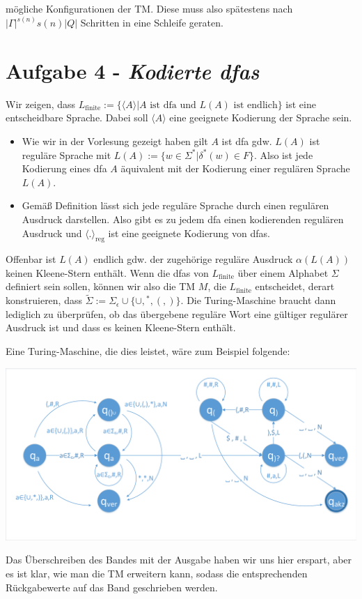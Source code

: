 \documentclass{article}
\begin{document}
mögliche Konfigurationen der TM. Diese muss also spätestens nach $|\Gamma|^{s(n)} s(n) |Q|$ Schritten in eine Schleife geraten.

\section*{Aufgabe 4 - \textit{Kodierte dfas}}

Wir zeigen, dass $L_\text{finite} := \{\langle A \rangle | A \text{ ist dfa und } L(A) \text{ ist endlich} \}$ ist eine entscheidbare Sprache. Dabei soll $\langle A \rangle$ eine geeignete Kodierung der Sprache sein.\\

\begin{itemize}
	\item Wie wir in der Vorlesung gezeigt haben gilt $A$ ist dfa gdw. $L(A)$ ist reguläre Sprache mit $L(A) := \{w \in \Sigma^* | \delta^*(w) \in F\}$. Also ist jede Kodierung eines dfa $A$ äquivalent mit der Kodierung einer regulären Sprache $L(A)$.
	
	\item Gemäß Definition lässt sich jede reguläre Sprache durch einen regulären Ausdruck darstellen. Also gibt es zu jedem dfa einen kodierenden regulären Ausdruck und $\langle . \rangle_\text{reg}$ ist eine geeignete Kodierung von dfas.
\end{itemize}

Offenbar ist $L(A)$ endlich gdw. der zugehörige reguläre Ausdruck $\alpha(L(A))$ keinen Kleene-Stern enthält. Wenn die dfas von $L_\text{finite}$ über einem Alphabet $\Sigma$ definiert sein sollen, können wir also die TM $M$, die $L_\text{finite}$ entscheidet, derart konstruieren, dass $\tilde{\Sigma} := \Sigma_\epsilon \cup \{\cup,{}^*, (,) \}$. Die Turing-Maschine braucht dann lediglich zu überprüfen, ob das übergebene reguläre Wort eine gültiger regulärer Ausdruck ist und dass es keinen Kleene-Stern enthält.

Eine Turing-Maschine, die dies leistet, wäre zum Beispiel folgende:

\begin{minipage}{\textwidth}
	\centering\includegraphics[width=\textwidth,page=1,trim={2 2 2 4},clip]{diagramme.pdf}
\end{minipage}
Das Überschreiben des Bandes mit der Ausgabe haben wir uns hier erspart, aber es ist klar, wie man die TM erweitern kann, sodass die entsprechenden Rückgabewerte auf das Band geschrieben werden.
\end{document}
